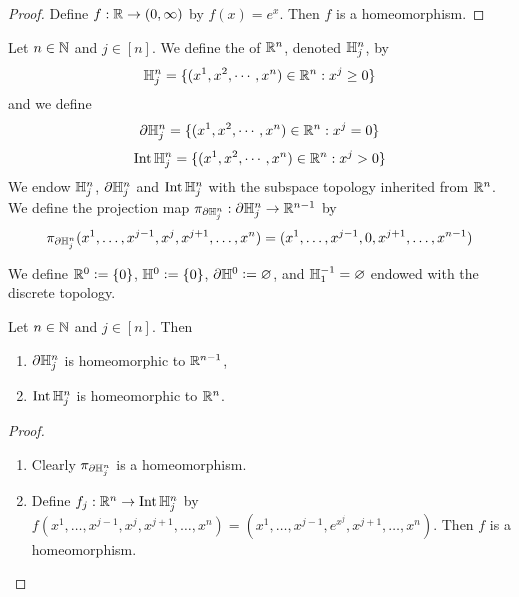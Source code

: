 \documentclass{book}
\begin{document}
	\begin{proof}
		Define $f: \mathbb{R} \rightarrow (0,\infty)$ by $f(x) = e^x$. Then $f$ is a homeomorphism.
	\end{proof}
	
	\begin{defn} 
		Let $n \in \mathbb{N}$ and $j \in [n]$. We define the  of $\mathbb{R}^n$, denoted $\mathbb{H}_j^n$, by $$\mathbb{H}_j^n = \{(x^1, x^2, \cdots, x^n) \in \mathbb{R}^n: x^j \geq 0\}$$ and we define $$\partial\mathbb{H}_j^n = \{(x^1, x^2, \cdots, x^n) \in \mathbb{R}^n: x^j = 0\}$$ 
		$$\operatorname{Int} \mathbb{H}_j^n = \{(x^1, x^2, \cdots, x^n) \in \mathbb{R}^n: x^j > 0\}$$
		We endow $\mathbb{H}_j^n$, $\partial \mathbb{H}_j^n$ and $\operatorname{Int} \mathbb{H}_j^n $ with the subspace topology inherited from $\mathbb{R}^n$.\\
		We define the projection map $\pi_{\partial \mathbb{H}^n_j}: \partial \mathbb{H}_j^n \rightarrow \mathbb{R}^{n-1}$ by 
		$$\pi_{\partial \mathbb{H}^n_j}(x^1, \ldots, x^{j-1}, x^j, x^{j+1}, \ldots, x^n) = (x^1, \ldots, x^{j-1}, 0, x^{j+1}, \ldots,  x^{n-1})$$
	\end{defn}

	\begin{defn} 
		We define $\mathbb{R}^0 \vcentcolon= \{0\}$, $\mathbb{H}^0 \vcentcolon= \{0\}$, $\partial \mathbb{H}^0 \vcentcolon= \varnothing$, and $\mathbb{H}^{-1}_1 = \varnothing$ endowed with the discrete topology.
	\end{defn}

	
	\begin{note}
	\end{note}
	
	\begin{ex} 
		Let $n \in \mathbb{N}$ and $j \in [n]$. Then 
	\begin{enumerate}
		\item $\partial \mathbb{H}^n_j$ is homeomorphic to $\mathbb{R}^{n-1}$,
		\item $\operatorname{Int} \mathbb{H}^n_j$ is homeomorphic to $\mathbb{R}^n$.
	\end{enumerate}  
	\end{ex}
	
	\begin{proof}\
	\begin{enumerate}
		\item Clearly $\pi_{\partial \mathbb{H}^n_j}$ is a homeomorphism.
		\item Define $f_j: \mathbb{R}^n \rightarrow \operatorname{Int} \mathbb{H}^n_j$ by $f(x^1, \ldots, x^{j-1}, x^j, x^{j+1}, \ldots, x^n) = (x^1, \ldots, x^{j-1}, e^{x^j}, x^{j+1}, \ldots, x^n)$. Then $f$ is a homeomorphism.
	\end{enumerate}
	\end{proof}	
\end{document}
